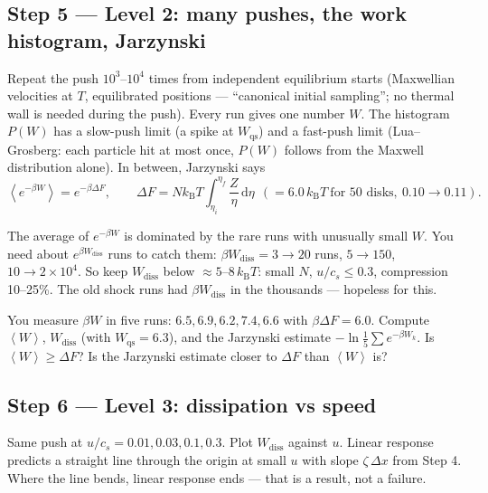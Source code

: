 \documentclass[11pt,a4paper]{article}
\newcommand{\kT}{k_{\mathrm B}T}
\newcommand{\avg}[1]{\left\langle #1 \right\rangle}
\newcommand{\dd}{\mathrm{d}}
\begin{document}
\subsection{Step 5 --- Level 2: many pushes, the work histogram, Jarzynski}
\begin{eli}
Repeat the push $10^3$--$10^4$ times from independent equilibrium starts (Maxwellian velocities at $T$, equilibrated positions --- ``canonical initial sampling''; no thermal wall is needed during the push). Every run gives one number $W$. The histogram $P(W)$ has a slow-push limit (a spike at $W_{\mathrm{qs}}$) and a fast-push limit (Lua--Grosberg: each particle hit at most once, $P(W)$ follows from the Maxwell distribution alone). In between, Jarzynski says
\begin{equation}
\avg{e^{-\beta W}} = e^{-\beta\Delta F},\qquad
\Delta F = N\kT\int_{\eta_i}^{\eta_f}\frac{Z}{\eta}\,\dd\eta\ \ (= 6.0\,\kT\ \text{for }50\text{ disks},\ 0.10\to0.11).
\end{equation}
\end{eli}
\begin{eli}
The average of $e^{-\beta W}$ is dominated by the rare runs with unusually small $W$. You need about $e^{\beta W_{\mathrm{diss}}}$ runs to catch them: $\beta W_{\mathrm{diss}} = 3\to20$ runs, $5\to150$, $10\to2\times10^4$. So keep $W_{\mathrm{diss}}$ below $\approx5$--$8\,\kT$: small $N$, $u/c_s\le0.3$, compression 10--25\%. The old shock runs had $\beta W_{\mathrm{diss}}$ in the thousands --- hopeless for this.
\end{eli}

\begin{ex}[Exercise 6]
You measure $\beta W$ in five runs: $6.5, 6.9, 6.2, 7.4, 6.6$ with $\beta\Delta F = 6.0$. Compute $\avg W$, $W_{\mathrm{diss}}$ (with $W_{\mathrm{qs}} = 6.3$), and the Jarzynski estimate $-\ln\frac15\sum e^{-\beta W_k}$. Is $\avg W \ge \Delta F$? Is the Jarzynski estimate closer to $\Delta F$ than $\avg W$ is?
\end{ex}

\subsection{Step 6 --- Level 3: dissipation vs speed}
\begin{eli}
Same push at $u/c_s = 0.01, 0.03, 0.1, 0.3$. Plot $W_{\mathrm{diss}}$ against $u$. Linear response predicts a straight line through the origin at small $u$ with slope $\zeta\,\Delta x$ from Step 4. Where the line bends, linear response ends --- that is a result, not a failure.
\end{eli}
\end{document}
